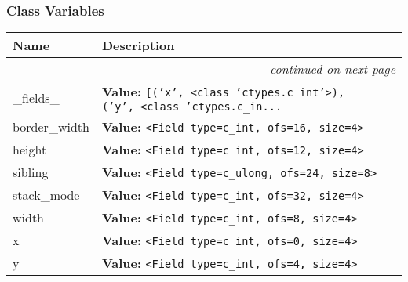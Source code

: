
  \subsubsection{Class Variables}

    \vspace{-1cm}
\hspace{\varindent}\begin{longtable}{|p{\varnamewidth}|p{\vardescrwidth}|l}
\cline{1-2}
\cline{1-2} \centering \textbf{Name} & \centering \textbf{Description}& \\
\cline{1-2}
\endhead\cline{1-2}\multicolumn{3}{r}{\small\textit{continued on next page}}\\\endfoot\cline{1-2}
\endlastfoot\raggedright \_\-f\-i\-e\-l\-d\-s\-\_\- & \raggedright \textbf{Value:} 
{\tt \texttt{[}\texttt{(}\texttt{'}\texttt{x}\texttt{'}\texttt{, }{\textless}class 'ctypes.c\_int'{\textgreater}\texttt{)}\texttt{, }\texttt{(}\texttt{'}\texttt{y}\texttt{'}\texttt{, }{\textless}class 'ctypes.c\_in\texttt{...}}&\\
\cline{1-2}
\raggedright b\-o\-r\-d\-e\-r\-\_\-w\-i\-d\-t\-h\- & \raggedright \textbf{Value:} 
{\tt {\textless}Field type=c\_int, ofs=16, size=4{\textgreater}}&\\
\cline{1-2}
\raggedright h\-e\-i\-g\-h\-t\- & \raggedright \textbf{Value:} 
{\tt {\textless}Field type=c\_int, ofs=12, size=4{\textgreater}}&\\
\cline{1-2}
\raggedright s\-i\-b\-l\-i\-n\-g\- & \raggedright \textbf{Value:} 
{\tt {\textless}Field type=c\_ulong, ofs=24, size=8{\textgreater}}&\\
\cline{1-2}
\raggedright s\-t\-a\-c\-k\-\_\-m\-o\-d\-e\- & \raggedright \textbf{Value:} 
{\tt {\textless}Field type=c\_int, ofs=32, size=4{\textgreater}}&\\
\cline{1-2}
\raggedright w\-i\-d\-t\-h\- & \raggedright \textbf{Value:} 
{\tt {\textless}Field type=c\_int, ofs=8, size=4{\textgreater}}&\\
\cline{1-2}
\raggedright x\- & \raggedright \textbf{Value:} 
{\tt {\textless}Field type=c\_int, ofs=0, size=4{\textgreater}}&\\
\cline{1-2}
\raggedright y\- & \raggedright \textbf{Value:} 
{\tt {\textless}Field type=c\_int, ofs=4, size=4{\textgreater}}&\\
\cline{1-2}
\end{longtable}


